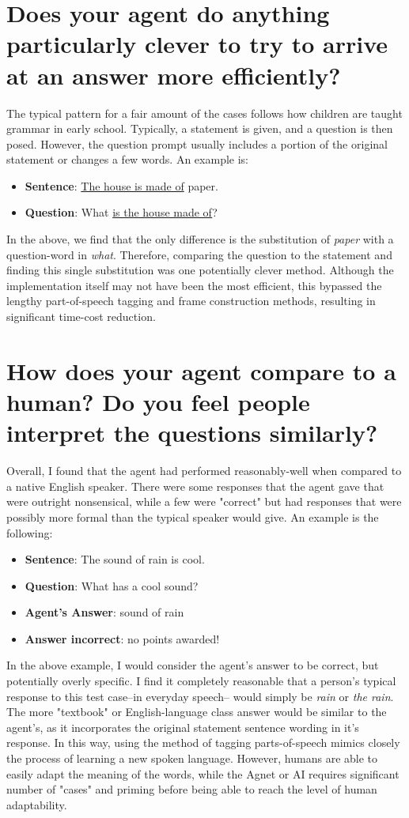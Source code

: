 \documentclass[
	letterpaper, %
]{jdf}
\begin{document}
\section{Does your agent do anything particularly clever to try to arrive at an answer more efficiently?}  \label{clever}
The typical pattern for a fair amount of the cases follows how children are taught grammar in early school. Typically, a statement is given, and a question is then posed. However, the question prompt usually includes a portion of the original statement or changes a few words. An example is: 
\begin{itemize}
	\item \textbf{Sentence}: \underline{The house is made of} paper. 
	\item \textbf{Question}: What \underline{is the house made of}?
\end{itemize} 

 In the above, we find that the only difference is the substitution of \textit{paper} with a question-word in \textit{what}. Therefore, comparing the question to the statement and finding this single substitution was one potentially clever method. Although the implementation itself may not have been the most efficient, this bypassed the lengthy part-of-speech tagging and frame construction methods, resulting in significant time-cost reduction.


\section{How does your agent compare to a human? Do you feel people interpret the questions similarly?}   
Overall, I found that the agent had performed reasonably-well when compared to a native English speaker. There were some responses that the agent gave that were outright nonsensical, while a few were "correct" but had responses that were possibly more formal than the typical speaker would give. An example is the following:
\begin{itemize}
	\item \textbf{Sentence}: The sound of rain is cool. 
	\item \textbf{Question}: What has a cool sound?
	\item \textbf{Agent's Answer}: sound of rain
	\item \textbf{Answer incorrect}: no points awarded!
\end{itemize} 

In the above example, I would consider the agent's answer to be correct, but potentially overly specific. I find it completely reasonable that a person's typical response to this test case--in everyday speech-- would simply be \textit{rain} or \textit{the rain}. The more "textbook" or English-language class answer would be similar to the agent's, as it incorporates the original statement sentence wording in it's response. In this way, using the method of tagging parts-of-speech mimics closely the process of learning a new spoken language. However, humans are able to easily adapt the meaning of the words, while the Agnet or AI requires significant number of "cases" and priming before being able to reach the level of human adaptability.
\end{document}
